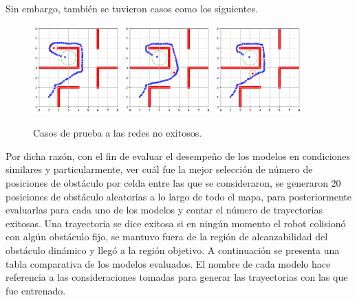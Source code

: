 \documentclass[spanish,mexico]{article}
\numberwithin{equation}{section}
\theoremstyle{definition}
\theoremstyle{remark}
\begin{document}
Sin embargo, también se tuvieron casos como los siguientes.
\begin{figure}[!h]
  \centering
	{\includegraphics[width=0.3\textwidth]{img/loss1.png}\label{fig:f1}}
  \hfill
  	{\includegraphics[width=0.3\textwidth]{img/loss2.png}\label{fig:f2}}
  	\hfill
  	{\includegraphics[width=0.3\textwidth]{img/loss3.png}\label{fig:f3}}
  \caption{Casos de prueba a las redes no exitosos.}
\end{figure}


Por dicha razón, con el fin de evaluar el desempeño de los modelos en condiciones similares y particularmente, ver cuál fue la mejor selección de número de posiciones de obstáculo por celda entre las que se consideraron, se generaron 20 posiciones de obstáculo aleatorias a lo largo de todo el mapa, para posteriormente evaluarlas para cada uno de los modelos y contar el número de trayectorias exitosas. Una trayectoria se dice exitosa si en ningún momento el robot colisionó con algún obstáculo fijo, se mantuvo fuera de la región de alcanzabilidad del obstáculo dinámico y llegó a la región objetivo. A continuación se presenta una tabla comparativa de los modelos evaluados. El nombre de cada modelo hace referencia a las consideraciones tomadas para generar las trayectorias con las que fue entrenado.
\newpage
\end{document}
